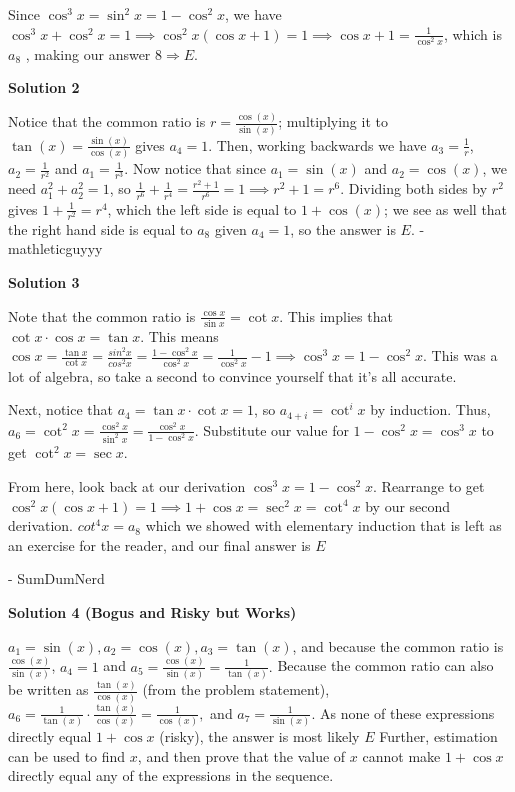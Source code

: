 \begin{enumerate}
 
Since $\cos^3x=\sin^2x=1-\cos^2x$, we have $\cos^3x+\cos^2x=1 \implies \cos^2x(\cos x+1)=1 \implies \cos x+1=\frac{1}{\cos^2 x}$, which is $a_8$ , making our answer $8 \Rightarrow \boxed{E}$.

 



\textbf{Solution 2}

Notice that the common ratio is $r=\frac{\cos(x)}{\sin(x)}$; multiplying it to $\tan(x)=\frac{\sin(x)}{\cos(x)}$ gives $a_4=1$. Then, working backwards we have $a_3=\frac{1}{r}$, $a_2=\frac{1}{r^2}$ and $a_1=\frac{1}{r^3}$. Now notice that since $a_1=\sin(x)$ and $a_2=\cos(x)$, we need $a_1^2+a_2^2=1$, so $\frac{1}{r^6}+\frac{1}{r^4}=\frac{r^2+1}{r^6}=1\implies r^2+1=r^6$. Dividing both sides by $r^2$ gives $1+\frac{1}{r^2}=r^4$, which the left side is equal to $1+\cos(x)$; we see as well that the right hand side is equal to $a_8$ given $a_4=1$, so the answer is $\boxed{E}$. - mathleticguyyy

 



\textbf{Solution 3}

Note that the common ratio is $\frac{\cos{x}}{\sin{x}} = \cot{x}$. This implies that $\cot{x} \cdot \cos{x} = \tan{x}$. This means $\cos{x} = \frac{\tan{x}}{\cot{x}} = \frac{sin^2{x}}{cos^2{x}} = \frac{1- \cos^2{x}}{\cos^2{x}} = \frac{1}{\cos^2{x}}-1 \implies \cos^3{x} = 1 - \cos^2{x}$. This was a lot of algebra, so take a second to convince yourself that it's all accurate. 

 Next, notice that $a_4 = \tan{x} \cdot \cot{x} = 1$, so $a_{4+i} = \cot^{i}{x}$ by induction. Thus, $a_6 = \cot^2{x} = \frac{\cos^2{x}}{\sin^2{x}} = \frac{\cos^2{x}}{1-\cos^2{x}}$. Substitute our value for $1 - \cos^2{x} = \cos^3{x}$ to get $\cot^2{x} = \sec{x}$. 

 From here, look back at our derivation $\cos^3{x} = 1 - \cos^2{x}$. Rearrange to get $\cos^2{x} \left( \cos{x}+1 \right) = 1 \implies  1+\cos{x} = \sec^2{x} = \cot^4{x}$ by our second derivation. $cot^4{x} = a_8$ which we showed with elementary induction that is left as an exercise for the reader, and our final answer is $\boxed{E}$

 - SumDumNerd

 



\textbf{Solution 4 (Bogus and Risky but Works)}

$a_1=\sin(x), a_2=\cos(x), a_3=\tan(x)$, and because the common ratio is $\frac{\cos(x)}{\sin(x)}$, $a_4=1$ and $a_5=\frac{\cos(x)}{\sin(x)}=\frac{1}{\tan(x)}.$ Because the common ratio can also  be written as $\frac{\tan(x)}{\cos(x)}$ (from the problem statement), $a_6=\frac{1}{\tan(x)} \cdot \frac{\tan(x)}{\cos(x)} = \frac{1}{\cos(x)},$ and $a_7=\frac{1}{\sin(x)}$. As none of these expressions directly equal $1+\cos x$ (risky), the answer is most likely $\boxed{E}$ Further, estimation can be used to find $x$, and then prove that the value of $x$ cannot make $1+\cos x$ directly equal any of the expressions in the sequence.


\end{enumerate}
